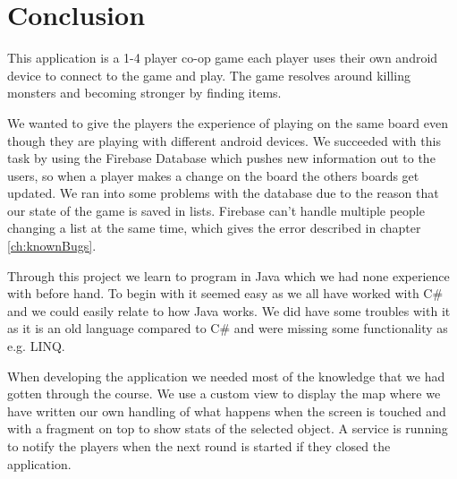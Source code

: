 \pagestyle{Uni}

\chapter{Conclusion}
This application is a 1-4 player co-op game each player uses their own android device to connect to the game and play. The game resolves around killing monsters and becoming stronger by finding items.

We wanted to give the players the experience of playing on the same board even though they are playing with different android devices. We succeeded with this task by using the Firebase Database which pushes new information out to the users, so when a player makes a change on the board the others boards get updated. We ran into some problems with the database due to the reason that our state of the game is saved in lists. Firebase can't handle multiple people changing a list at the same time, which gives the error described in chapter \ref{ch:knownBugs}.

Through this project we learn to program in Java which we had none experience with before hand. To begin with it seemed easy as we all have worked with C\# and we could easily relate to how Java works. We did have some troubles with it as it is an old language compared to C\# and were missing some functionality as e.g. LINQ.

When developing the application we needed most of the knowledge that we had gotten through the course. We use a custom view to display the map where we have written our own handling of what happens when the screen is touched and with a fragment on top to show stats of the selected object. A service is running to notify the players when the next round is started if they closed the application. 